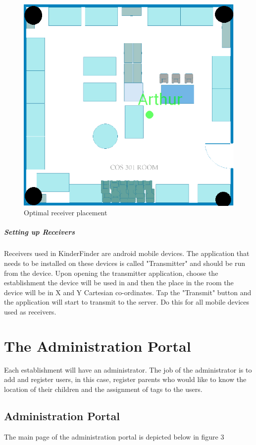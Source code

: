 \documentclass{article}
\begin{document}
\begin{figure}[H]
\centering
\includegraphics[scale=0.6]{pic1.png}
\caption{Optimal receiver placement}
\end{figure}

\subparagraph{Setting up Receivers}
Receivers used in KinderFinder are android mobile devices. The application that needs to be installed on these devices is called "Transmitter" and should be run from the device. Upon opening the transmitter application, choose the establishment the device will be used in and then the place in the room the device will be in X and Y Cartesian co-ordinates. Tap the "Transmit" button and the application will start to transmit to the server. Do this for all mobile devices used as receivers. 


\newpage

\section{The Administration Portal}

Each establishment will have an administrator. The job of the administrator is to add and register users, in this case, register parents who would like to know the location of their children and the assignment of tags to the users.

\subsection{Administration Portal}
The main page of the administration portal is depicted below in figure 3
\end{document}
